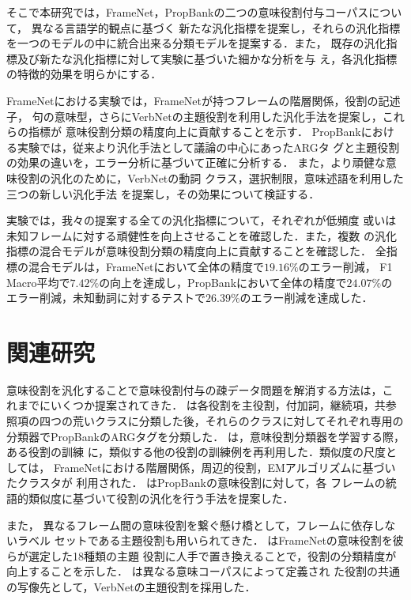 \documentclass[japanese]{jnlp_1.4}
\begin{document}
そこで本研究では，FrameNet，PropBankの二つの意味役割付与コーパスについて，
異なる言語学的観点に基づく
新たな汎化指標を提案し，それらの汎化指標
を一つのモデルの中に統合出来る分類モデルを提案する．また，
既存の汎化指標及び新たな汎化指標に対して実験に基づいた細かな分析を与
え，各汎化指標の特徴的効果を明らかにする．

FrameNetにおける実験では，FrameNetが持つフレームの階層関係，役割の記述子，
句の意味型，さらにVerbNetの主題役割を利用した汎化手法を提案し，これらの指標が
意味役割分類の精度向上に貢献することを示す．
PropBankにおける実験では，従来より汎化手法として議論の中心にあったARGタ
グと主題役割の効果の違いを，エラー分析に基づいて正確に分析する．
また，より頑健な意味役割の汎化のために，VerbNetの動詞
クラス，選択制限，意味述語を利用した三つの新しい汎化手法
を提案し，その効果について検証する．

実験では，我々の提案する全ての汎化指標について，それぞれが低頻度
或いは未知フレームに対する頑健性を向上させることを確認した．また，複数
の汎化指標の混合モデルが意味役割分類の精度向上に貢献することを確認した．
全指標の混合モデルは，FrameNetにおいて全体の精度で$19.16\%$のエラー削減，
F1 Macro平均で$7.42\%$の向上を達成し，PropBankにおいて全体の精度で$24.07\%$の
エラー削減，未知動詞に対するテストで$26.39\%$のエラー削減を達成した．


\section{関連研究}

意味役割を汎化することで意味役割付与の疎データ問題を解消する方法は，こ
れまでにいくつか提案されてきた．
は各役割を主役割，付加詞，継続項，共参
照項の四つの荒いクラスに分類した後，それらのクラスに対してそれぞれ専用の
分類器でPropBankのARGタグを分類した．
は，意味役割分類器を学習する際，ある役割の訓練
に，類似する他の役割の訓練例を再利用した．類似度の尺度としては，
FrameNetにおける階層関係，周辺的役割，EMアルゴリズムに基づいたクラスタが
利用された．
はPropBankの意味役割に対して，各
フレームの統語的類似度に基づいて役割の汎化を行う手法を提案した．

また，
異なるフレーム間の意味役割を繋ぐ懸け橋として，フレームに依存しないラベル
セットである主題役割も用いられてきた．
はFrameNetの意味役割を彼らが選定した18種類の主題
役割に人手で置き換えることで，役割の分類精度が向上することを示した．
は異なる意味コーパスによって定義され
た役割の共通の写像先として，VerbNetの主題役割を採用した．
\end{document}
